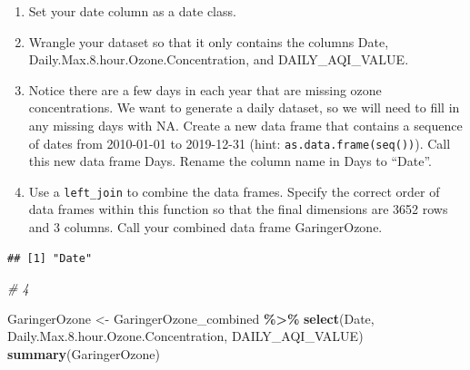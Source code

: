 \documentclass[
]{article}
\newenvironment{Shaded}{\begin{snugshade}}{\end{snugshade}}
\newcommand{\AttributeTok}[1]{\textcolor[rgb]{0.13,0.29,0.53}{#1}}
\newcommand{\CommentTok}[1]{\textcolor[rgb]{0.56,0.35,0.01}{\textit{#1}}}
\newcommand{\FloatTok}[1]{\textcolor[rgb]{0.00,0.00,0.81}{#1}}
\newcommand{\FunctionTok}[1]{\textcolor[rgb]{0.13,0.29,0.53}{\textbf{#1}}}
\newcommand{\NormalTok}[1]{#1}
\newcommand{\OtherTok}[1]{\textcolor[rgb]{0.56,0.35,0.01}{#1}}
\newcommand{\SpecialCharTok}[1]{\textcolor[rgb]{0.81,0.36,0.00}{\textbf{#1}}}
\newcommand{\StringTok}[1]{\textcolor[rgb]{0.31,0.60,0.02}{#1}}
\begin{document}
\begin{enumerate}
\def\labelenumi{\arabic{enumi}.}
\setcounter{enumi}{2}
\item
  Set your date column as a date class.
\item
  Wrangle your dataset so that it only contains the columns Date,
  Daily.Max.8.hour.Ozone.Concentration, and DAILY\_AQI\_VALUE.
\item
  Notice there are a few days in each year that are missing ozone
  concentrations. We want to generate a daily dataset, so we will need
  to fill in any missing days with NA. Create a new data frame that
  contains a sequence of dates from 2010-01-01 to 2019-12-31 (hint:
  \texttt{as.data.frame(seq())}). Call this new data frame Days. Rename
  the column name in Days to ``Date''.
\item
  Use a \texttt{left\_join} to combine the data frames. Specify the
  correct order of data frames within this function so that the final
  dimensions are 3652 rows and 3 columns. Call your combined data frame
  GaringerOzone.
\end{enumerate}

\begin{Shaded}
\end{Shaded}

\begin{verbatim}
## [1] "Date"
\end{verbatim}

\begin{Shaded}
\begin{Highlighting}[]
\CommentTok{\# 4}

\NormalTok{GaringerOzone }\OtherTok{\textless{}{-}}\NormalTok{ GaringerOzone\_combined }\SpecialCharTok{\%\textgreater{}\%}
  \FunctionTok{select}\NormalTok{(Date,}
\NormalTok{         Daily.Max.}\FloatTok{8.}\NormalTok{hour.Ozone.Concentration,}
\NormalTok{         DAILY\_AQI\_VALUE)}
\FunctionTok{summary}\NormalTok{(GaringerOzone)}
\end{Highlighting}
\end{Shaded}
\end{document}
